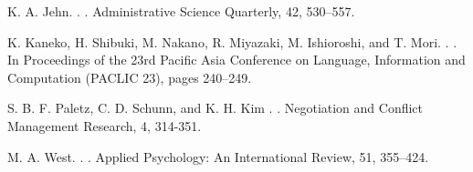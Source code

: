 \documentclass[11pt,letterpaper]{article}
\begin{document}
\begin{thebibliography}{}
K. A. Jehn.
. 
. 
\newblock Administrative Science Quarterly, 42, 530–557.

K. Kaneko, H. Shibuki, M. Nakano, R. Miyazaki, M. Ishioroshi, and T. Mori.
. 
. 
\newblock In Proceedings of the 23rd Pacific Asia Conference on Language, Information and Computation (PACLIC 23), pages 240--249.

S. B. F. Paletz, C. D. Schunn, and K. H. Kim
. 
. 
\newblock Negotiation and Conflict Management Research, 4, 314-351.

M. A. West.
. 
. 
\newblock Applied Psychology: An International Review, 51, 355–424.

\end{thebibliography}
\end{document}
